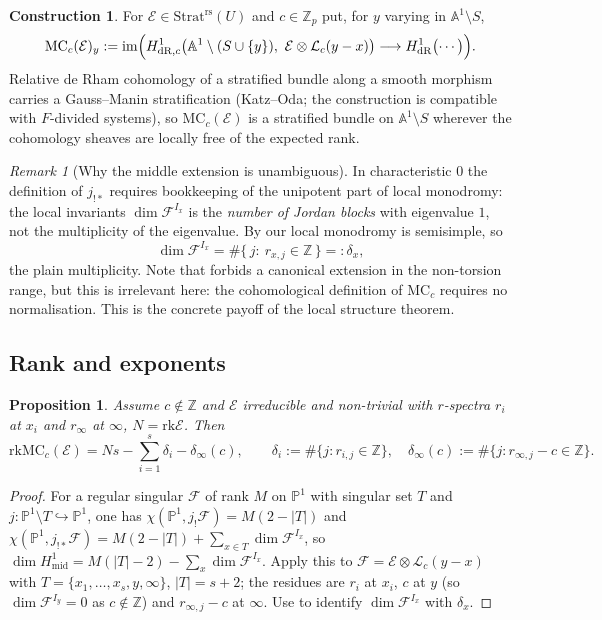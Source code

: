 \documentclass[11pt,reqno]{amsart}
\newcommand{\Zp}{\mathbb{Z}_p}
\newcommand{\ZZ}{\mathbb{Z}}
\newcommand{\PP}{\mathbb{P}}
\newcommand{\AAA}{\mathbb{A}}
\newcommand{\cE}{\mathcal{E}}
\newcommand{\cF}{\mathcal{F}}
\newcommand{\cL}{\mathcal{L}}
\newcommand{\Strat}{\mathrm{Strat}}
\newcommand{\rs}{\mathrm{rs}}
\newcommand{\rk}{\mathrm{rk}}
\newcommand{\im}{\mathrm{im}}
\newcommand{\MC}{\mathrm{MC}}
\newcommand{\dR}{\mathrm{dR}}
\theoremstyle{plain}
\newtheorem{proposition}[theorem]{Proposition}
\theoremstyle{definition}
\newtheorem{construction}[theorem]{Construction}
\theoremstyle{remark}
\newtheorem{remark}[theorem]{Remark}
\numberwithin{equation}{section}
\begin{document}
\begin{construction}\label{con:MC}
For $\cE\in\Strat^{\rs}(U)$ and $c\in\Zp$ put, for $y$ varying in
$\AAA^1\setminus S$,
\[
   \MC_c(\cE)_y:=\im\Bigl(
     H^1_{\dR,c}\bigl(\AAA^1\setminus(S\cup\{y\}),\ \cE\otimes\cL_c(y-x)\bigr)
     \longrightarrow
     H^1_{\dR}\bigl(\cdots\bigr)\Bigr).
\]
Relative de Rham cohomology of a stratified bundle along a smooth
morphism carries a Gauss--Manin stratification (Katz--Oda; the
construction is compatible with $F$-divided systems), so $\MC_c(\cE)$ is
a stratified bundle on $\AAA^1\setminus S$ wherever the cohomology sheaves
are locally free of the expected rank.
\end{construction}

\begin{remark}[Why the middle extension is unambiguous]\label{rem:middle}
In characteristic $0$ the definition of $j_{!*}$ requires bookkeeping of
the unipotent part of local monodromy: the local invariants
$\dim\cF^{I_x}$ is the \emph{number of Jordan blocks} with eigenvalue $1$,
not the multiplicity of the eigenvalue.  By  our
local monodromy is semisimple, so
\[
   \dim\cF^{I_x}=\#\{\,j:\ r_{x,j}\in\ZZ\,\}=:\delta_x ,
\]
the plain multiplicity.  Note that  forbids a
canonical extension in the non-torsion range, but this is irrelevant here:
the cohomological definition of $\MC_c$ requires no normalisation.  This
is the concrete payoff of the local structure theorem.
\end{remark}

\subsection{Rank and exponents}

\begin{proposition}\label{prop:MCrank}
Assume $c\notin\ZZ$ and $\cE$ irreducible and non-trivial with
$r$-spectra $r_i$ at $x_i$ and $r_\infty$ at $\infty$, $N=\rk\cE$.  Then
\[
   \rk\MC_c(\cE)=Ns-\sum_{i=1}^s\delta_i-\delta_\infty(c),
   \qquad
   \delta_i:=\#\{j: r_{i,j}\in\ZZ\},\quad
   \delta_\infty(c):=\#\{j: r_{\infty,j}-c\in\ZZ\}.
\]
\end{proposition}
\begin{proof}
For a regular singular $\cF$ of rank $M$ on $\PP^1$ with singular set $T$
and $j\colon\PP^1\setminus T\hookrightarrow\PP^1$, one has
$\chi(\PP^1,j_!\cF)=M(2-|T|)$ and
$\chi(\PP^1,j_{!*}\cF)=M(2-|T|)+\sum_{x\in T}\dim\cF^{I_x}$, so
$\dim H^1_{\mathrm{mid}}=M(|T|-2)-\sum_x\dim\cF^{I_x}$.  Apply this to
$\cF=\cE\otimes\cL_c(y-x)$ with $T=\{x_1,\dots,x_s,y,\infty\}$,
$|T|=s+2$; the residues are $r_i$ at $x_i$, $c$ at $y$ (so
$\dim\cF^{I_y}=0$ as $c\notin\ZZ$) and $r_{\infty,j}-c$ at $\infty$.  Use
 to identify $\dim\cF^{I_x}$ with $\delta_x$.
\end{proof}
\end{document}
